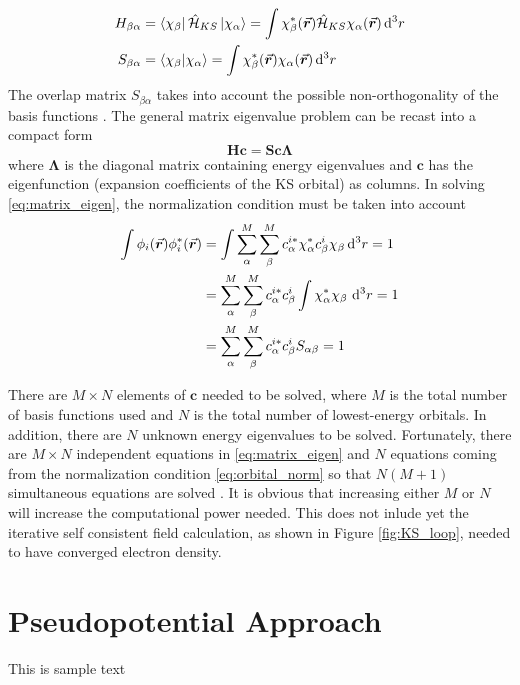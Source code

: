 \begin{align}
    H_{\beta\alpha} &= \bra{\chi_\beta} \hat{\mathcal{H}}_{KS} \ket{\chi_\alpha} = \int \chi^*_\beta(\va*{r}) \hat{\mathcal{H}}_{KS}\chi_\alpha(\va*{r}) \dd[3]{r}\\
    S_{\beta\alpha} &= \braket{\chi_\beta}{\chi_\alpha} = \int \chi^*_\beta(\va*{r}) \chi_\alpha(\va*{r}) \dd[3]{r}
\end{align}
The overlap matrix $S_{\beta\alpha}$ takes into account the possible non-orthogonality of the basis functions \citep{Woods2019}. The general matrix eigenvalue problem can be recast into a compact form \citep{Requist2008}
\begin{equation} \label{eq:matrix_eigen}
    \bm{H c =  S c \Lambda}
\end{equation}
where $\bm{\Lambda}$ is the diagonal matrix containing energy eigenvalues and  $\bm{c}$ has the eigenfunction (expansion coefficients of the KS orbital) as columns. In solving \eqref{eq:matrix_eigen}, the normalization condition must be taken into account
\begin{align} 
   \int \phi_i(\va*{r}) \phi^*_i(\va*{r}) &= \int \sum^M_\alpha \sum^M_\beta c^{i*}_\alpha \chi^*_\alpha c^i_\beta \chi_\beta \dd[3]{r} = 1 \\
   &= \sum^M_\alpha \sum^M_\beta c^{i*}_\alpha c^i_\beta \int \chi^*_\alpha  \chi_\beta\, \dd[3]{r} = 1 \\
   &= \sum^M_\alpha \sum^M_\beta c^{i*}_\alpha c^i_\beta S_{\alpha\beta} = 1 \label{eq:orbital_norm}
\end{align}

There are $M \times N$ elements of $\bm{c}$ needed to be solved, where $M$ is the total number of basis functions used and $N$ is the total number of lowest-energy orbitals. In addition, there are $N$ unknown energy eigenvalues to be solved. Fortunately, there are $M \times N$ independent equations in \eqref{eq:matrix_eigen} and $N$ equations coming from the normalization condition \eqref{eq:orbital_norm} so that $N(M+1)$ simultaneous equations are solved \citep{Cottenier2013}. It is obvious that increasing either $M$ or $N$ will increase the computational power needed. This does not inlude yet the  iterative self consistent field calculation, as shown in Figure \ref{fig:KS_loop}, needed to have converged electron density. 


\newpage

\section{Pseudopotential Approach}
    This is sample text
